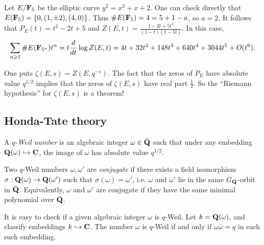 \begin{example}
Let $E/\mathbf{F}_5$ be the elliptic curve $y^2=x^3+x+2$. One can check directly that 
$E(\mathbf{F}_5) = \{0,(1,\pm 2), (4,0)\}$. Thus $\# E(\mathbf{F}_5) = 4=5+1-a$, so $a=2$. 
It follows that $P_E(t) = t^2-2 t+5$ and 
$Z(E,t) =\frac{1-2 t+5 t^2}{(1-t)(1-5 t)}$. In this case, 
\[
  \sum_{n\geqslant 1} \# E(\mathbf{F}_{5^n}) t^n = t\frac{d}{dt}\log Z(E,t)
    = 4t + 32 t^2 + 148 t^3 + 640 t^4 + 3044 t^5 + O(t^6) \text{.}
\]
\end{example}

One puts $\zeta(E,s) = Z(E,q^{-s})$. The fact that the zeros of 
$P_E$ have absolute value $q^{1/2}$ implies that the zeros of 
$\zeta(E,s)$ have real part $\frac 1 2$. So the ``Riemann hypothesis'' for 
$\zeta(E,s)$ is a theorem!


\subsection{Honda-Tate theory}

\begin{definition}
A \emph{$q$-Weil number} is an algebraic integer $\omega\in \bar{\mathbf{Q}}$ such that 
under any embedding $\mathbf{Q}(\omega)\hookrightarrow\mathbf{C}$, the image of $\omega$ has 
absolute value $q^{1/2}$. 
\end{definition}

Two $q$-Weil numbers $\omega,\omega'$ are \emph{conjugate} if there exists a 
field isomorphism $\sigma:\mathbf{Q}(\omega) \to \mathbf{Q}(\omega')$ such that 
$\sigma(\omega)=\omega'$, i.e. $\omega$ and $\omega'$ lie in the same 
$G_{\mathbf{Q}}$-orbit in $\bar{\mathbf{Q}}$. Equivalently, $\omega$ and $\omega'$ are conjugate 
if they have the same minimal polynomial over $\mathbf{Q}$. 

It is easy to check if a given algebraic integer $\omega$ is $q$-Weil. Let 
$k=\mathbf{Q}(\omega)$, and classify embeddings $k\hookrightarrow \mathbf{C}$. The number 
$\omega$ is $q$-Weil if and only if $\omega\bar\omega = q$ in each such 
embedding.  

